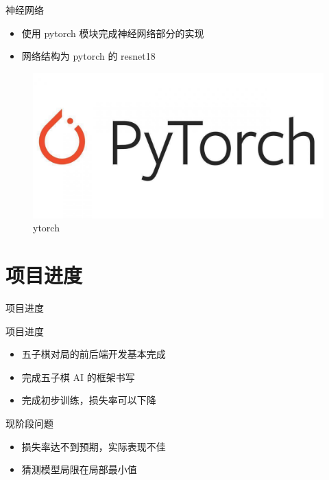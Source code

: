 \documentclass[compress]{beamer}
\begin{document}
\begin{frame}{神经网络}
	\begin{itemize}
		\item 使用 pytorch 模块完成神经网络部分的实现
		\item 网络结构为 pytorch 的 resnet18
	\end{itemize}
	
	\begin{figure}[htbp]
	    \begin{minipage}[t]{0.7\textwidth}
	      \centering
	      \includegraphics[width=0.9\linewidth]{pytorch.jpeg}
	      \caption{ytorch}
	    \end{minipage}
    \end{figure}
\end{frame}

\section{项目进度}

\begin{frame}{项目进度}
	\begin{block}{项目进度}
		\begin{itemize}
			\setlength{\itemsep}{6pt}
			\item 五子棋对局的前后端开发基本完成
			\item 完成五子棋 AI 的框架书写
			\item 完成初步训练，损失率可以下降
		\end{itemize}
	\end{block}	
	\begin{block}{现阶段问题}
		\begin{itemize}
			\item 损失率达不到预期，实际表现不佳
			\item 猜测模型局限在局部最小值
		\end{itemize}
	\end{block}
\end{frame}
\end{document}

